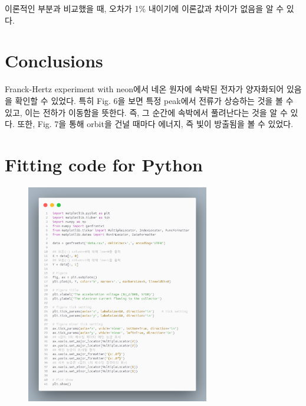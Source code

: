 \documentclass[a4paper, 10pt, nanum]{CSUniSchoolLabReport}
\begin{document}
	이론적인 부분과 비교했을 때, 오차가 1\% 내이기에 이론값과 차이가 없음을 알 수 있다.


\section{Conclusions}

	Franck-Hertz experiment with neon에서 네온 원자에 속박된 전자가 양자화되어 있음을 확인할 수 있었다. 특히 Fig. 6을 보면 특정 peak에서 전류가 상승하는 것을 볼 수 있고, 이는 전하가 이동함을 뜻한다. 즉, 그 순간에 속박에서 풀려난다는 것을 알 수 있다. 또한, Fig. 7을 통해 orbit을 건널 때마다 에너지, 즉 빛이 방출됨을 볼 수 있었다.


\section{Fitting code for Python}

\begin{figure}[htb!]
	\centering
	\includegraphics[width=8cm]{code1.png}
	\label{fig:code}
\end{figure}



\end{document}
